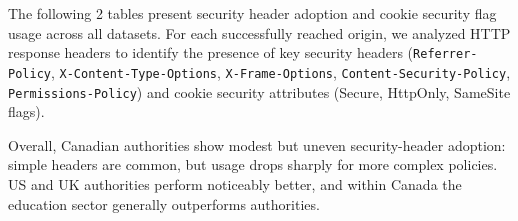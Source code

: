 \documentclass[pdflatex,sn-mathphys-num]{sn-jnl}
\newlength{\inlinecapskip}
\newenvironment{inlinecap}[1][\textwidth]
  {\par\vspace{\inlinecapskip}\noindent\begin{minipage}{#1}\centering}
  {\end{minipage}\par\vspace{\inlinecapskip}}
\numberwithin{equation}{section}
\theoremstyle{thmstyleone}
\theoremstyle{thmstyletwo}%
\theoremstyle{thmstylethree}%
\begin{document}
\vspace{1em}The following 2 tables present security header adoption and 
cookie security flag usage across all datasets. For each successfully reached origin, 
we analyzed HTTP response headers to identify the presence of key security headers 
(\texttt{Referrer-Policy}, \texttt{X-Content-Type-Options}, 
\texttt{X-Frame-Options}, \texttt{Content-Security-Policy}, \texttt{Permissions-Policy}) and 
cookie security attributes (Secure, HttpOnly, SameSite flags).

\begin{inlinecap}
\label{tab:security_headers_presence}
\centering
\tiny
\setlength{\tabcolsep}{2pt}
%
\end{inlinecap}

Overall, Canadian authorities show modest but uneven security-header adoption: 
simple headers are common, but usage drops sharply for more complex policies. 
US and UK authorities perform noticeably better, and within Canada the education sector generally 
outperforms authorities.

\end{document}
